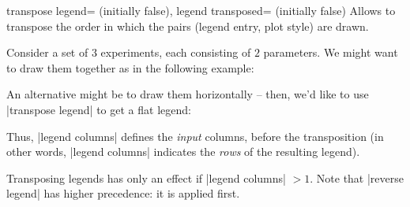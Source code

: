 \begin{pgfplotskeylist}{%
    transpose legend= (initially false),%
    legend transposed= (initially false)%
}
    Allows to transpose the order in which the pairs (legend entry, plot style)
    are drawn.

    Consider a set of $3$ experiments, each consisting of $2$ parameters. We
    might want to draw them together as in the following example:
\begin{codeexample}[]
\end{codeexample}

    An alternative might be to draw them horizontally -- then, we'd like to use
    |transpose legend| to get a flat legend:
\begin{codeexample}[]
\end{codeexample}

    Thus, |legend columns| defines the \emph{input} columns, before the
    transposition (in other words, |legend columns| indicates the \emph{rows}
    of the resulting legend).

    Transposing legends has only an effect if |legend columns| $>1$. Note that
    |reverse legend| has higher precedence: it is applied first.
\end{pgfplotskeylist}


